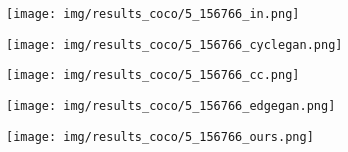 \documentclass[10pt,twocolumn,letterpaper]{article}
\begin{document}
\begin{figure}[tbp]
\captionsetup[subfigure]{labelformat=empty}
\begin{center}
  \begin{subfigure}[b]{\cocowidth\linewidth}
  \texttt{[image: img/results\_coco/5\_156766\_in.png]}
  \end{subfigure}
  \begin{subfigure}[b]{\cocowidth\linewidth}
  \texttt{[image: img/results\_coco/5\_156766\_cyclegan.png]}
  \end{subfigure}
  \begin{subfigure}[b]{\cocowidth\linewidth}
  \texttt{[image: img/results\_coco/5\_156766\_cc.png]}
  \end{subfigure}
   \begin{subfigure}[b]{\cocowidth\linewidth}
  \texttt{[image: img/results\_coco/5\_156766\_edgegan.png]}
  \end{subfigure}
  \begin{subfigure}[b]{\cocowidth\linewidth}
  \texttt{[image: img/results\_coco/5\_156766\_ours.png]}
  \end{subfigure}
  

\end{center}
\end{figure}
\end{document}
